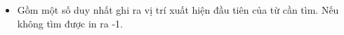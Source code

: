 \begin{itemize}
	\item Gồm một số duy nhất ghi ra vị trí xuất hiện đầu tiên của từ cần tìm. Nếu không tìm được in ra -1.
\end{itemize}